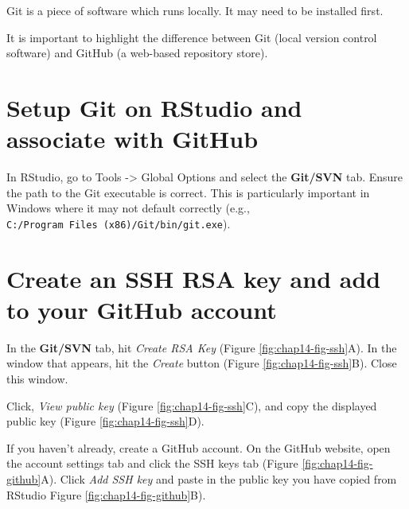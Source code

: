 \documentclass[
  12pt,
  krantz2]{krantz}
\begin{document}
Git is a piece of software which runs locally.
It may need to be installed first.

It is important to highlight the difference between Git (local version control software) and GitHub (a web-based repository store).

\hypertarget{setup-git-on-rstudio-and-associate-with-github}{%
\section{Setup Git on RStudio and associate with GitHub}\label{setup-git-on-rstudio-and-associate-with-github}}

In RStudio, go to Tools -\textgreater{} Global Options and select the \textbf{Git/SVN} tab.
Ensure the path to the Git executable is correct.
This is particularly important in Windows where it may not default correctly (e.g., \texttt{C:/Program\ Files\ (x86)/Git/bin/git.exe}).

\hypertarget{create-an-ssh-rsa-key-and-add-to-your-github-account}{%
\section{Create an SSH RSA key and add to your GitHub account}\label{create-an-ssh-rsa-key-and-add-to-your-github-account}}


In the \textbf{Git/SVN} tab, hit \emph{Create RSA Key} (Figure \ref{fig:chap14-fig-ssh}A).
In the window that appears, hit the \emph{Create} button (Figure \ref{fig:chap14-fig-ssh}B).
Close this window.

Click, \emph{View public key} (Figure \ref{fig:chap14-fig-ssh}C), and copy the displayed public key (Figure \ref{fig:chap14-fig-ssh}D).

If you haven't already, create a GitHub account.
On the GitHub website, open the account settings tab and click the SSH keys tab (Figure \ref{fig:chap14-fig-github}A).
Click \emph{Add SSH key} and paste in the public key you have copied from RStudio Figure \ref{fig:chap14-fig-github}B).
\end{document}
